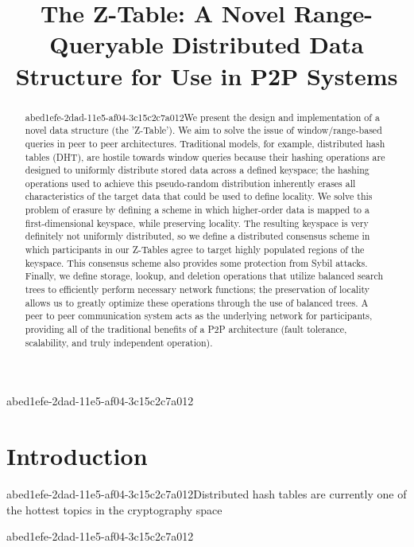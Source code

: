 \documentclass[12pt]{article}
\title{The Z-Table: A Novel Range-Queryable Distributed Data Structure for Use in P2P Systems}
\begin{document}
\maketitle

\begin{abstract}
abed1efe-2dad-11e5-af04-3c15c2c7a012We present the design and implementation of a novel data structure (the 'Z-Table'). We aim to solve the issue of window/range-based queries in peer to peer architectures. Traditional models, for example,  distributed hash tables (DHT), are hostile towards window queries because their hashing operations are designed to uniformly distribute stored data across a defined keyspace; the hashing operations used to achieve this pseudo-random distribution inherently erases all characteristics of the target data that could be used to define locality. We solve this problem of erasure by defining a scheme in which higher-order data is mapped to a first-dimensional keyspace, while preserving locality. The resulting keyspace is very definitely not uniformly distributed, so we define a distributed consensus scheme in which participants in our Z-Tables agree to target highly populated regions of the keyspace. This consensus scheme also provides some protection from Sybil attacks. Finally, we define storage, lookup, and deletion operations that utilize balanced search trees to efficiently perform necessary network functions; the preservation of locality allows us to greatly optimize these operations through the use of balanced trees. A peer to peer communication system acts as the underlying network for participants, providing all of the traditional benefits of a P2P architecture (fault tolerance, scalability, and truly independent operation).
\end{abstract}


abed1efe-2dad-11e5-af04-3c15c2c7a012\newpage
\section{Introduction}
abed1efe-2dad-11e5-af04-3c15c2c7a012Distributed hash tables are currently one of the hottest topics in the cryptography space~\cite{Stoica:2001dj,Rowstron:2001ea,Ratnasamy:2001wn}

abed1efe-2dad-11e5-af04-3c15c2c7a012\printbibliography
\end{document}
